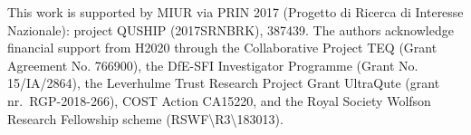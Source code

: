 \documentclass[
	aps, pra,
	superscriptaddress, twocolumn,
	floatfix,
	10pt
]{revtex4-1}
\newcommand{\parTitle}[1]{\noindent{\color{Mahogany}(\emph{#1})}}
\newcommand{\calH}{{\mathcal{H}}}
\renewcommand{\parTitle}[1]{}
\begin{document}
\begin{acknowledgments}

This work is supported by MIUR via PRIN 2017 (Progetto di Ricerca di Interesse Nazionale): project QUSHIP (2017SRNBRK), 387439. The authors acknowledge financial support from H2020 through the Collaborative Project TEQ (Grant Agreement No.  766900), the DfE-SFI Investigator Programme (Grant No. 15/IA/2864), the Leverhulme Trust Research Project Grant UltraQute (grant nr.~RGP-2018-266), COST Action CA15220, and the Royal Society Wolfson Research Fellowship scheme (RSWF\textbackslash R3\textbackslash183013).
\end{acknowledgments}

\appendix



\end{document}
